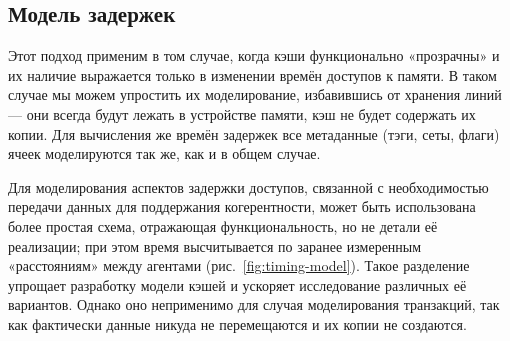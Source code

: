 \subsection{Модель задержек}

Этот подход применим в том случае, когда кэши функционально «прозрачны» и их наличие выражается только в изменении времён доступов к памяти. В таком случае мы можем упростить их моделирование,  избавившись от хранения линий --- они всегда будут лежать в устройстве памяти, кэш не будет содержать их копии. Для вычисления же времён задержек все метаданные (тэги, сеты, флаги) ячеек моделируются так же, как и в общем случае.

Для моделирования аспектов задержки доступов, связанной с необходимостью передачи данных для поддержания когерентности, может быть использована более простая схема, отражающая функциональность, но не детали её реализации; при этом время высчитывается по заранее измеренным «расстояниям» между агентами (рис.~\ref{fig:timing-model}). Такое разделение упрощает разработку модели кэшей и ускоряет исследование различных её вариантов. Однако оно неприменимо для случая моделирования транзакций, так как фактически данные никуда не перемещаются и их копии не создаются.

